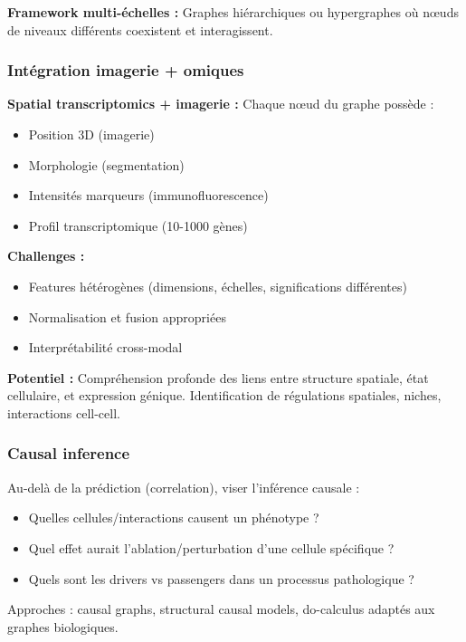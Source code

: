 \textbf{Framework multi-échelles :}
Graphes hiérarchiques ou hypergraphes où nœuds de niveaux différents coexistent et interagissent.

\subsubsection{Intégration imagerie + omiques}

\textbf{Spatial transcriptomics + imagerie :}
Chaque nœud du graphe possède :
\begin{itemize}
    \item Position 3D (imagerie)
    \item Morphologie (segmentation)
    \item Intensités marqueurs (immunofluorescence)
    \item Profil transcriptomique (10-1000 gènes)
\end{itemize}

\textbf{Challenges :}
\begin{itemize}
    \item Features hétérogènes (dimensions, échelles, significations différentes)
    \item Normalisation et fusion appropriées
    \item Interprétabilité cross-modal
\end{itemize}

\textbf{Potentiel :}
Compréhension profonde des liens entre structure spatiale, état cellulaire, et expression génique. Identification de régulations spatiales, niches, interactions cell-cell.

\subsubsection{Causal inference}

Au-delà de la prédiction (correlation), viser l'inférence causale :
\begin{itemize}
    \item Quelles cellules/interactions causent un phénotype ?
    \item Quel effet aurait l'ablation/perturbation d'une cellule spécifique ?
    \item Quels sont les drivers vs passengers dans un processus pathologique ?
\end{itemize}

Approches : causal graphs, structural causal models, do-calculus adaptés aux graphes biologiques.

